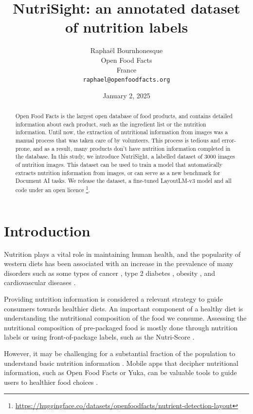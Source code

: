 \documentclass{article}
\title{NutriSight: an annotated dataset of nutrition labels}
\date{January 2, 2025}
\author{ {\hspace{1mm}Raphaël Bournhonesque} \\
	Open Food Facts\\
	France\\
	\texttt{raphael@openfoodfacts.org} \\
}
\begin{document}
\maketitle

\begin{abstract}
	Open Food Facts is the largest open database of food products, and contains detailed information about each product, such as the ingredient list or the nutrition information. Until now, the extraction of nutritional information from images was a manual process that was taken care of by volunteers. This process is tedious and error-prone, and as a result, many products don't have nutrition information completed in the database. In this study, we introduce NutriSight, a labelled dataset of 3000 images of nutrition images. This dataset can be used to train a model that automatically extracts nutrition information from images, or can serve as a new benchmark for Document AI tasks. We release the dataset, a fine-tuned LayoutLM-v3 model and all code under an open licence \footnote{\url{https://huggingface.co/datasets/openfoodfacts/nutrient-detection-layout}}.
\end{abstract}

\section{Introduction}

Nutrition plays a vital role in maintaining human health, and the popularity of western diets has been associated with an increase in the prevalence of many disorders such as some types of cancer \citep{10.1001/archinte.163.3.309}, type 2 diabetes \citep{10.2337/dc11-0442}, obesity \citep{kant2004dietary}, and cardiovascular diseases \citep{FUNG200161}.

Providing nutrition information is considered a relevant strategy to guide consumers towards healthier diets. An important component of a healthy diet is understanding the nutritional composition of the food we consume. Assessing the nutritional composition of pre-packaged food is mostly done through nutrition labels or using front-of-package labels, such as the Nutri-Score \citep{julia:hal-01779114}.

However, it may be challenging for a substantial fraction of the population to understand basic nutrition information \citep{sinclair2013sociodemographic}. Mobile apps that decipher nutritional information, such as Open Food Facts or Yuka, can be valuable tools to guide users to healthier food choices \citep{alabbas2024effect}.
\end{document}

